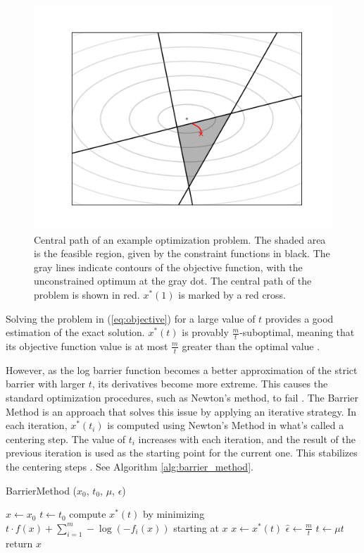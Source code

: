 \documentclass[12pt, a4paper]{report}
\begin{document}
\begin{figure}
    \centering
    \includegraphics[scale=0.6]{figs/barrier_method_example.png}
    \caption{Central path of an example optimization problem. The shaded area is the feasible region, given by the constraint functions in black. The gray lines indicate contours of the objective function, with the unconstrained optimum at the gray dot. The central path of the problem is shown in red. $x^*(1)$ is marked by a red cross.}
    \label{fig:barrier_method_example}
\end{figure}

Solving the problem in (\ref{eq:objective}) for a large value of $t$ provides a good estimation of the exact solution.
$x^*(t)$ is provably $\frac{m}{t}$-suboptimal, meaning that its objective function value is at most $\frac{m}{t}$ greater than the optimal value \cite[566]{boyd}.

However, as the log barrier function becomes a better approximation of the strict barrier with larger $t$, its derivatives become more extreme.
This causes the standard optimization procedures, such as Newton's method, to fail \cite[564]{boyd}.
The Barrier Method is an approach that solves this issue by applying an iterative strategy.
In each iteration, $x^*(t_i)$ is computed using Newton's Method in what's called a centering step.
The value of $t_i$ increases with each iteration, and the result of the previous iteration is used as the starting point for the current one.
This stabilizes the centering steps \cite[569]{boyd}.
See Algorithm \ref{alg:barrier_method}.

\begin{algorithm}
    \caption[The basic Barrier Method.]{BarrierMethod ($x_0$, $t_0$, $\mu$, $\epsilon$)}
    \label{alg:barrier_method}
    \begin{algorithmic}
        \State $x \gets x_0$
        \State $t \gets t_0$
        \Repeat
            \State compute $x^*(t)$ by minimizing $t \cdot f(x) + \sum_{i=1}^m -\log(-f_i(x))$ starting at $x$
            \State $x \gets x^*(t)$
            \State $\hat{\epsilon} \gets \frac{m}{t}$
            \State $t \gets \mu t$
        \Until{$\hat{\epsilon} < \epsilon$}
        \State return $x$
    \end{algorithmic}
\end{algorithm}
\end{document}
